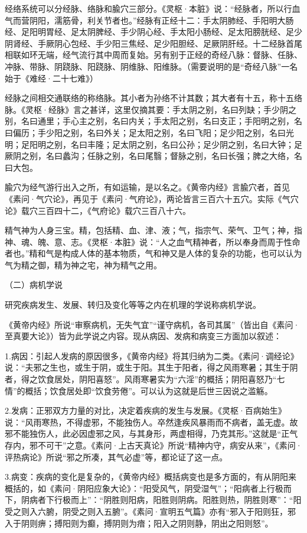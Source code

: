 \documentclass[a4paper,12pt,UTF8,twoside]{ctexbook}
\begin{document}
经络系统可以分经脉、络脉和腧穴三部分。《灵枢·本脏》说：“经脉者，所以行血气而营阴阳，濡筋骨，利关节者也。”经脉有正经十二：手太阴肺经、手阳明大肠经、足阳明胃经、足太阴脾经、手少阴心经、手太阳小肠经、足太阳膀胱经、足少阴肾经、手厥阴心包经、手少阳三焦经、足少阳胆经、足厥阴肝经。十二经脉首尾相联如环无端，经气流行其中周而复始。另有别于正经的奇经八脉：督脉、任脉、冲脉、带脉、阴跷脉、阳跷脉、阴维脉、阳维脉。（需要说明的是“奇经八脉”一名始于《难经·二十七难》）

经脉之间相交通联络的称络脉。其小者为孙络不计其数；其大者有十五，称十五络脉。《灵枢·经脉》言之甚详，这里仅摘其要：手太阴之别，名曰列缺；手少阴之别，名曰通里；手心主之别，名曰内关；手太阳之别，名曰支正；手阳明之别，名曰偏历；手少阳之别，名曰外关；足太阳之别，名曰飞阳；足少阳之别，名曰光明；足阳明之别，名曰丰隆；足太阴之别，名曰公孙；足少阴之别，名曰大钟；足厥阴之别，名曰蠡沟；任脉之别，名曰尾翳；督脉之别，名曰长强；脾之大络，名曰大包。

腧穴为经气游行出入之所，有如运输，是以名之。《黄帝内经》言腧穴者，首见《素问·气穴论》，再见于《素问·气府论》，两论皆言三百六十五穴。实际《气穴论》载穴三百四十二，《气府论》载穴三百八十六。

精气神为人身三宝。精，包括精、血、津、液；气，指宗气、荣气、卫气；神，指神、魂、魄、意、志。《灵枢·本脏》说：“人之血气精神者，所以奉身而周于性命者也。”精和气是构成人体的基本物质，气和神又是人体的复杂的功能，也可以认为气为精之御，精为神之宅，神为精气之用。

（二）病机学说

研究疾病发生、发展、转归及变化等等之内在机理的学说称病机学说。

《黄帝内经》所说“审察病机，无失气宜”“谨守病机，各司其属”（皆出自《素问·至真要大论》）皆为此学说之内容。现从病因、发病和病变三方面加以叙述：

1.病因：引起人发病的原因很多，《黄帝内经》将其归纳为二类。《素问·调经论》说：“夫邪之生也，或生于阴，或生于阳。其生于阳者，得之风雨寒暑；其生于阴者，得之饮食居处，阴阳喜怒”。风雨寒暑实为“六淫”的概括；阴阳喜怒乃“七情”的概括；饮食居处即“饮食劳倦”。可以认为这就是后世三因说之滥觞。

2.发病：正邪双方力量的对比，决定着疾病的发生与发展。《灵枢·百病始生》说：“风雨寒热，不得虚邪，不能独伤人。卒然逢疾风暴雨而不病者，盖无虚。故邪不能独伤人，此必因虚邪之风，与其身形，两虚相得，乃克其形。”这就是“正气存内，邪不可干”之意。《素问·上古天真论》所说“精神内守，病安从来”，《素问·评热病论》所说“邪之所凑，其气必虚”等，都论证了这一点。

3.病变：疾病的变化是复杂的，《黄帝内经》概括病变也是多方面的，有从阴阳来概括的，如《素问·阴阳应象大论》：“阳受风气，阴受湿气”；“阳病者上行极而下，阴病者下行极而上”：“阴胜则阳病，阳胜则阴病。阳胜则热，阴胜则寒”：“阳受之则入六腑，阴受之则入五腑”。《素问·宣明五气篇》亦有“邪入于阳则狂，邪入于阴则痹；搏阳则为癫，搏阴则为瘖；阳入之阴则静，阴出之阳则怒”。
\end{document}
